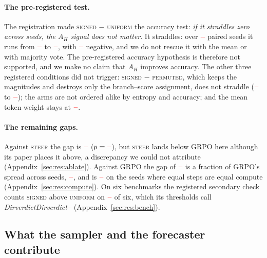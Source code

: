 \documentclass[11pt]{article}
\newcommand{\AH}{A_{H}}
\providecommand{\PENDING}{\textcolor{red}{\textbf{--}}}
\newcommand{\num}[1]{\ifcsname #1\endcsname\csname #1\endcsname\else\PENDING\fi}
\begin{document}
\paragraph{The pre-registered test.} The registration made \textsc{signed} $-$
\textsc{uniform} the accuracy test: \emph{if it straddles zero across seeds, the $\AH$
signal does not matter}. It straddles: over $\num{Nsigneduniform}$ paired seeds it runs
from $\num{CLosigneduniformacc}$ to $\num{CHisigneduniformacc}$, with
$\num{CNegsigneduniformacc}$ negative, and we do not rescue it with the mean or with
majority vote. The pre-registered accuracy hypothesis is therefore not supported, and
we make no claim that $\AH$ improves accuracy. The other three registered conditions
did not trigger: \textsc{signed} $-$ \textsc{permuted}, which keeps the magnitudes and destroys
only the branch--score assignment, does not straddle ($\num{CLosignedpermutedacc}$ to
$\num{CHisignedpermutedacc}$); the arms are not ordered alike by entropy and accuracy;
and the mean token weight stays at $\num{Rsignedtwmean}$.

\paragraph{The remaining gaps.} Against \textsc{steer} the gap is
$\num{Csignedsteeracc}$ ($p = \num{Psignedsteeracc}$), but \textsc{steer} lands below
GRPO here although its paper places it above, a discrepancy we could not attribute
(Appendix~\ref{sec:res:ablate}). Against GRPO the gap of $\num{Csignedgrpoacc}$ is a
fraction of GRPO's spread across seeds, $\num{Sgrpoacc}$, and is $\num{Cmhisignedgrpoacc}$
on the seeds where equal steps are equal compute (Appendix~\ref{sec:res:compute}). On
six benchmarks the registered secondary check counts \textsc{signed} above \textsc{uniform} on
$\num{Dirconsistency}$ of six, which its thresholds call
\emph{\num{Dirverdict}} (Appendix~\ref{sec:res:bench}).

\subsection{What the sampler and the forecaster contribute}
\label{sec:res:apparatus}
\end{document}
